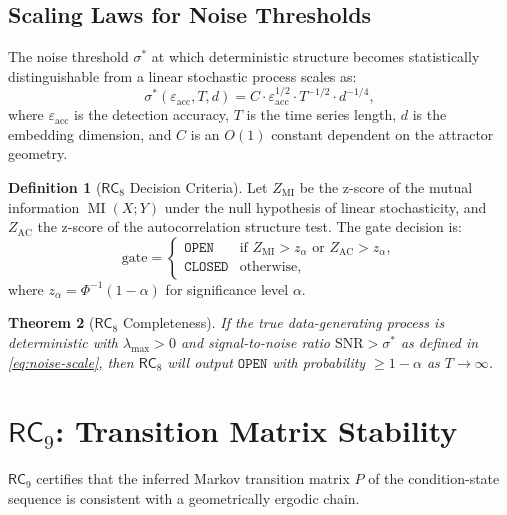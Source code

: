 \documentclass[11pt,twoside]{article}
\theoremstyle{plain}
\newtheorem{theorem}{Theorem}[section]
\theoremstyle{definition}
\newtheorem{definition}[theorem]{Definition}
\theoremstyle{remark}
\DeclareMathOperator{\MI}{MI}
\newcommand{\RC}[1]{\textsf{RC}_{#1}}
\begin{document}
\subsection{Scaling Laws for Noise Thresholds}

The noise threshold $\sigma^*$ at which deterministic structure becomes
statistically distinguishable from a linear stochastic process scales as:
\begin{equation}\label{eq:noise-scale}
  \sigma^*(\varepsilon_{\mathrm{acc}}, T, d)
  = C\cdot\varepsilon_{\mathrm{acc}}^{1/2}\cdot T^{-1/2}\cdot d^{-1/4},
\end{equation}
where $\varepsilon_{\mathrm{acc}}$ is the detection accuracy, $T$ is the time
series length, $d$ is the embedding dimension, and $C$ is an $O(1)$ constant
dependent on the attractor geometry.

\begin{definition}[$\RC{8}$ Decision Criteria]
Let $Z_{\mathrm{MI}}$ be the z-score of the mutual information $\MI(X;Y)$ under
the null hypothesis of linear stochasticity, and $Z_{\mathrm{AC}}$ the z-score
of the autocorrelation structure test.  The gate decision is:
\begin{equation}\label{eq:rc8-decision}
  \text{gate} =
  \begin{cases}
    \mathtt{OPEN}   & \text{if } Z_{\mathrm{MI}} > z_\alpha \text{ or }
                       Z_{\mathrm{AC}} > z_\alpha,\\
    \mathtt{CLOSED} & \text{otherwise,}
  \end{cases}
\end{equation}
where $z_\alpha = \Phi^{-1}(1-\alpha)$ for significance level $\alpha$.
\end{definition}

\begin{theorem}[$\RC{8}$ Completeness]
If the true data-generating process is deterministic with $\lambda_{\max}>0$ and
signal-to-noise ratio $\mathrm{SNR}>\sigma^{*}$ as defined in
\eqref{eq:noise-scale}, then $\RC{8}$ will output $\mathtt{OPEN}$ with
probability $\ge 1-\alpha$ as $T\to\infty$.
\end{theorem}

\section{\texorpdfstring{$\RC{9}$}{RC9}: Transition Matrix Stability}

$\RC{9}$ certifies that the inferred Markov transition matrix $P$ of the
condition-state sequence is consistent with a geometrically ergodic chain.
\end{document}
